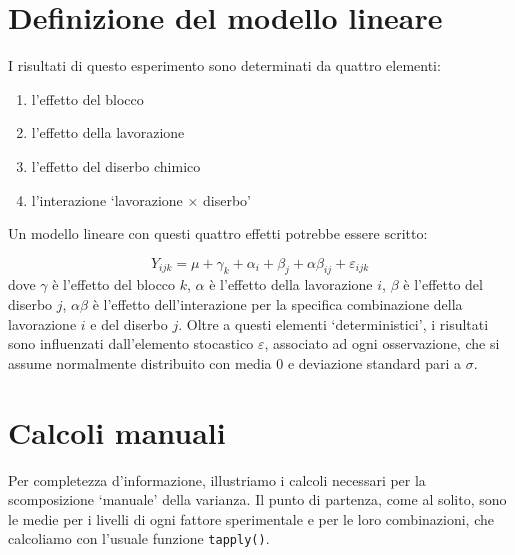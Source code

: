 \documentclass[a4paper,12pt,oneside]{book}
\providecommand{\tightlist}{%
  \setlength{\itemsep}{0pt}\setlength{\parskip}{0pt}}
\begin{document}
\hypertarget{definizione-del-modello-lineare-1}{%
\section{Definizione del modello lineare}\label{definizione-del-modello-lineare-1}}

I risultati di questo esperimento sono determinati da quattro elementi:

\begin{enumerate}
\def\labelenumi{\arabic{enumi}.}
\tightlist
\item
  l'effetto del blocco
\item
  l'effetto della lavorazione
\item
  l'effetto del diserbo chimico
\item
  l'interazione `lavorazione \(\times\) diserbo'
\end{enumerate}

Un modello lineare con questi quattro effetti potrebbe essere scritto:

\[Y_{ijk} = \mu + \gamma_k + \alpha_i + \beta_j + \alpha\beta_{ij} + \varepsilon_{ijk}\]
dove \(\gamma\) è l'effetto del blocco \(k\), \(\alpha\) è l'effetto della lavorazione \(i\), \(\beta\) è l'effetto del diserbo \(j\), \(\alpha\beta\) è l'effetto dell'interazione per la specifica combinazione della lavorazione \(i\) e del diserbo \(j\). Oltre a questi elementi `deterministici', i risultati sono influenzati dall'elemento stocastico \(\varepsilon\), associato ad ogni osservazione, che si assume normalmente distribuito con media 0 e deviazione standard pari a \(\sigma\).

\hypertarget{calcoli-manuali}{%
\section{Calcoli manuali}\label{calcoli-manuali}}

Per completezza d'informazione, illustriamo i calcoli necessari per la scomposizione `manuale' della varianza. Il punto di partenza, come al solito, sono le medie per i livelli di ogni fattore sperimentale e per le loro combinazioni, che calcoliamo con l'usuale funzione \texttt{tapply()}.
\end{document}
